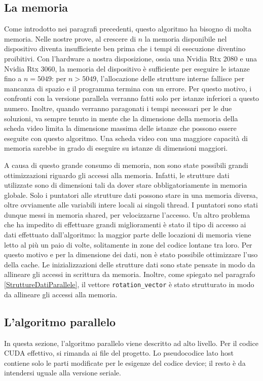 \documentclass[12pt]{article}
\begin{document}
    \subsection{La memoria}
    Come introdotto nei paragrafi precedenti, questo algoritmo ha bisogno di molta memoria. Nelle nostre prove, al crescere di $n$ la memoria disponibile nel dispositivo diventa insufficiente ben prima che i tempi di esecuzione diventino proibitivi. Con l'hardware a nostra disposizione, ossia una Nvidia Rtx 2080 e una Nvidia Rtx 3060, la memoria del dispositivo è sufficiente per eseguire le istanze fino a $n=5049$: per $n>5049$, l'allocazione delle strutture interne fallisce per mancanza di spazio e il programma termina con un errore. Per questo motivo, i confronti con la versione parallela verranno fatti solo per istanze inferiori a questo numero. Inoltre, quando verranno paragonati i tempi necessari per le due soluzioni, va sempre tenuto in mente che la dimensione della memoria della scheda video limita la dimensione massima delle istanze che possono essere eseguite con questo algoritmo. Una scheda video con una maggiore capacità di memoria sarebbe in grado di eseguire su istanze di dimensioni maggiori.

    A causa di questo grande consumo di memoria, non sono state possibili grandi ottimizzazioni riguardo gli accessi alla memoria. Infatti, le strutture dati utilizzate sono di dimensioni tali da dover stare obbligatoriamente in memoria globale. Solo i puntatori alle strutture dati possono stare in una memoria diversa, oltre ovviamente alle variabili intere locali ai singoli thread. I puntatori sono stati dunque messi in memoria shared, per velocizzarne l'accesso. Un altro problema che ha impedito di effettuare grandi miglioramenti è stato il tipo di accesso ai dati effettuato dall'algoritmo: la maggior parte delle locazioni di memoria viene letto al più un paio di volte, solitamente in zone del codice lontane tra loro. Per questo motivo e per la dimensione dei dati, non è stato possibile ottimizzare l'uso della cache. Le inizializzazioni delle strutture dati sono state pensate in modo da allineare gli accessi in scrittura da memoria. Inoltre, come spiegato nel paragrafo \ref{StruttureDatiParallele}, il vettore \texttt{rotation\_vector} è stato strutturato in modo da allineare gli accessi alla memoria.
    
    \subsection{L'algoritmo parallelo}
    In questa sezione, l'algoritmo parallelo viene descritto ad alto livello. Per il codice CUDA effettivo, si rimanda ai file del progetto. Lo pseudocodice lato host contiene solo le parti modificate per le esigenze del codice device; il resto è da intendersi uguale alla versione seriale.
\end{document}
